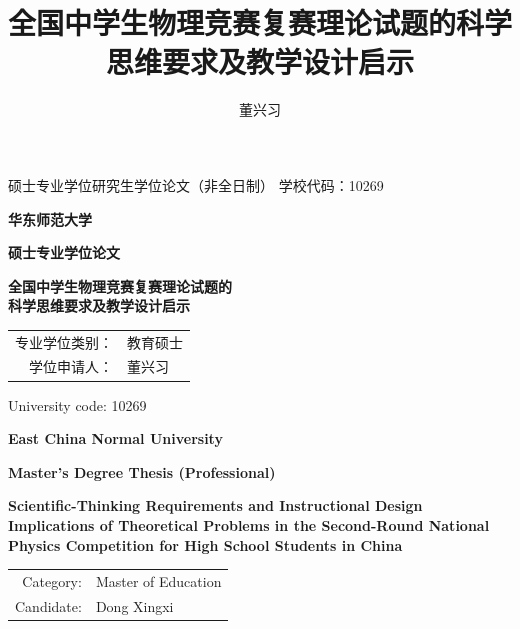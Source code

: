 \documentclass[
  12pt,
  a4paper,twoside,openany]{ctexbook}
\title{全国中学生物理竞赛复赛理论试题的科学思维要求及教学设计启示}
\author{董兴习}
\date{}
\renewcommand{\arraystretch}{1.22}
\begin{document}
\frontmatter
\begin{titlepage}
\thispagestyle{empty}
\begin{flushleft}
 硕士专业学位研究生学位论文（非全日制）
\hfill 学校代码：10269
\end{flushleft}
\vspace*{2.2cm}
\begin{center}
{\heiti{}\bfseries 华东师范大学\par}
\vspace{0.7cm}
{\heiti{}\bfseries 硕士专业学位论文\par}
\vspace{2.8cm}
{\songti{}\bfseries 全国中学生物理竞赛复赛理论试题的\\[0.45em]科学思维要求及教学设计启示\par}
\vfill
\renewcommand{\arraystretch}{1.55}
\begin{tabular}{r l}
专业学位类别： & 教育硕士 \\
学位申请人： & 董兴习 \\
\end{tabular}
\vfill
{ \par}
\end{center}
\clearpage
\thispagestyle{empty}
\begin{flushright}
 University code: 10269
\end{flushright}
\vspace*{2.3cm}
\begin{center}
{\bfseries\fontsize{21pt}{28pt}\selectfont East China Normal University\par}
\vspace{0.7cm}
{\bfseries\fontsize{18pt}{24pt}\selectfont Master's Degree Thesis (Professional)\par}
\vspace{2.7cm}
{\bfseries\fontsize{16pt}{23pt}\selectfont Scientific-Thinking Requirements and Instructional Design Implications of Theoretical Problems in the Second-Round National Physics Competition for High School Students in China\par}
\vfill
\renewcommand{\arraystretch}{1.55}
\begin{tabular}{r l}
Category: & Master of Education \\
Candidate: & Dong Xingxi \\
\end{tabular}
\vfill
{\fontsize{12pt}{16pt}\selectfont \par}
\end{center}
\end{titlepage}
\end{document}
